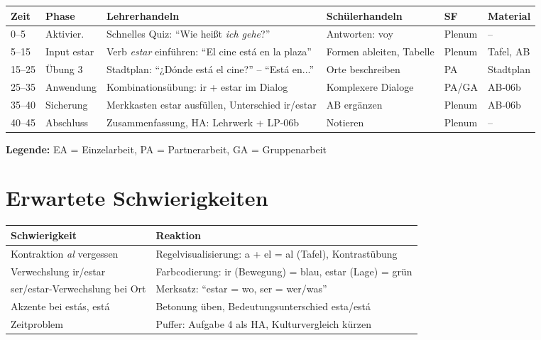 \documentclass[11pt,a4paper]{article}
\begin{document}
\begin{longtable}{|p{1cm}|p{1.5cm}|p{4cm}|p{3cm}|p{1.5cm}|p{2cm}|}
\hline
\textbf{Zeit} & \textbf{Phase} & \textbf{Lehrerhandeln} & \textbf{Schülerhandeln} & \textbf{SF} & \textbf{Material} \\
\hline
\endhead

0--5 & Aktivier. & Schnelles Quiz: ``Wie heißt \textit{ich gehe}?'' & Antworten: voy & Plenum & -- \\
\hline

5--15 & Input estar & Verb \textit{estar} einführen: ``El cine está en la plaza'' & Formen ableiten, Tabelle & Plenum & Tafel, AB \\
\hline

15--25 & Übung 3 & Stadtplan: ``¿Dónde está el cine?'' -- ``Está en...'' & Orte beschreiben & PA & Stadtplan \\
\hline

25--35 & Anwendung & Kombinationsübung: ir + estar im Dialog & Komplexere Dialoge & PA/GA & AB-06b \\
\hline

35--40 & Sicherung & Merkkasten estar ausfüllen, Unterschied ir/estar & AB ergänzen & Plenum & AB-06b \\
\hline

40--45 & Abschluss & Zusammenfassung, HA: Lehrwerk + LP-06b & Notieren & Plenum & -- \\
\hline
\end{longtable}

\textbf{Legende:} EA = Einzelarbeit, PA = Partnerarbeit, GA = Gruppenarbeit

\section{Erwartete Schwierigkeiten}

\begin{tabular}{|p{4.5cm}|p{8cm}|}
\hline
\textbf{Schwierigkeit} & \textbf{Reaktion} \\
\hline
Kontraktion \textit{al} vergessen & Regelvisualisierung: a + el = al (Tafel), Kontrastübung \\
\hline
Verwechslung ir/estar & Farbcodierung: ir (Bewegung) = blau, estar (Lage) = grün \\
\hline
ser/estar-Verwechslung bei Ort & Merksatz: ``estar = wo, ser = wer/was'' \\
\hline
Akzente bei estás, está & Betonung üben, Bedeutungsunterschied esta/está \\
\hline
Zeitproblem & Puffer: Aufgabe 4 als HA, Kulturvergleich kürzen \\
\hline
\end{tabular}
\end{document}
